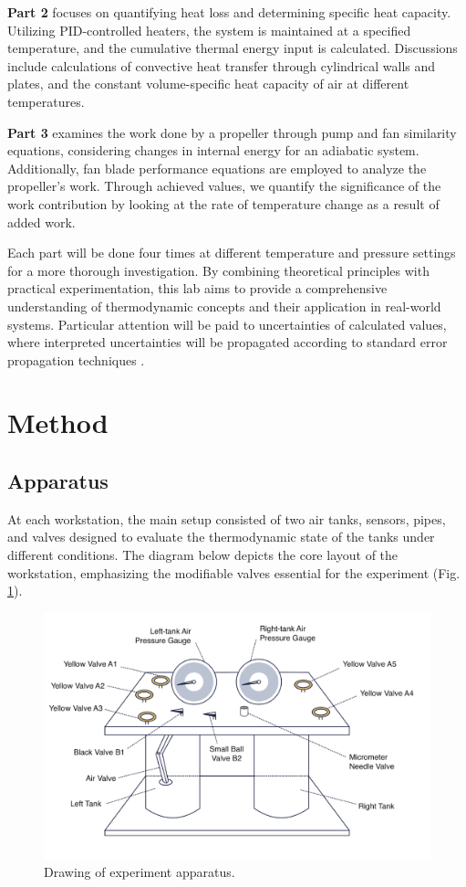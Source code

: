 \documentclass[12pt]{article}
\begin{document}
\textbf{Part 2} focuses on quantifying heat loss and determining specific heat capacity. Utilizing PID-controlled heaters, the system is maintained at a specified temperature, and the cumulative thermal energy input is calculated. Discussions include calculations of convective heat transfer through cylindrical walls and plates, and the constant volume-specific heat capacity of air at different temperatures.

\textbf{Part 3} examines the work done by a propeller through pump and fan similarity equations, considering changes in internal energy for an adiabatic system. Additionally, fan blade performance equations are employed to analyze the propeller's work. Through achieved values, we quantify the significance of the work contribution by looking at the rate of temperature change as a result of added work.

Each part will be done four times at different temperature and pressure settings for a more thorough investigation. By combining theoretical principles with practical experimentation, this lab aims to provide a comprehensive understanding of thermodynamic concepts and their application in real-world systems. Particular attention will be paid to uncertainties of calculated values, where interpreted uncertainties will be propagated according to standard error propagation techniques \autocite{vern_uncertainties_2000}.

\section*{Method}
\subsection*{Apparatus}
At each workstation, the main setup consisted of two air tanks, sensors, pipes, and valves designed to evaluate the thermodynamic state of the tanks under different conditions. The diagram below depicts the core layout of the workstation, emphasizing the modifiable valves essential for the experiment (Fig. \ref{fig:aparatus}).
\begin{figure}[t!]
\centering
\includegraphics[width=0.7\linewidth]{figure/aparatus.png}
\caption{Drawing of experiment apparatus.}
\label{fig:aparatus}
\end{figure}
\end{document}
